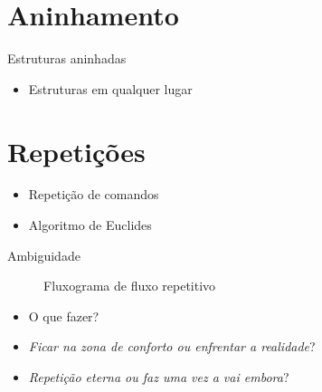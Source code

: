 \documentclass[14pt]{beamer}
\begin{document}
	\section{Aninhamento}
		\begin{frame}{Estruturas aninhadas}
			\begin{itemize}
				\presentationPause\item Estruturas em qualquer lugar
			\end{itemize}
			\begin{multicols}{2}
				\only<1>{}
			\end{multicols}
		\end{frame}

	\section{Repetições}
		\begin{frame}
			\begin{itemize}
				\presentationPause\item Repetição de comandos
				\presentationPause\item Algoritmo de Euclides
			\end{itemize}
		\end{frame}

		\begin{frame}
			
		\end{frame}
		
		\begin{frame}{Ambiguidade}
			\presentationPause
			\begin{figure}
				\centering
				
				\caption{Fluxograma de fluxo repetitivo}
				\label{fig.flow.loop}
			\end{figure}
			\begin{itemize}
				\presentationPause\item O que fazer?
				\presentationPause\item \emph{Ficar na zona de conforto ou enfrentar a realidade}?
				\presentationPause\item \emph{Repetição eterna ou faz uma vez a vai embora}?
			\end{itemize}
		\end{frame}
\end{document}
